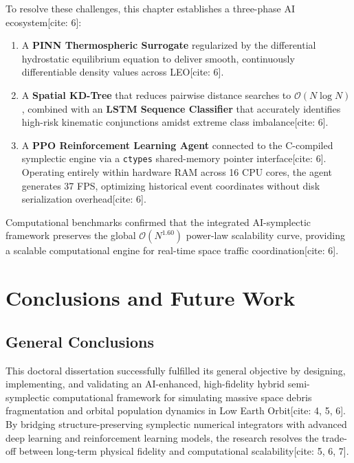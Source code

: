 \documentclass[12pt,letterpaper,twoside]{book}
\begin{document}
To resolve these challenges, this chapter establishes a three-phase AI ecosystem[cite: 6]:
\begin{enumerate}
    \item A \textbf{PINN Thermospheric Surrogate} regularized by the differential hydrostatic equilibrium equation to deliver smooth, continuously differentiable density values across LEO[cite: 6].
    \item A \textbf{Spatial KD-Tree} that reduces pairwise distance searches to $\mathcal{O}(N \log N)$, combined with an \textbf{LSTM Sequence Classifier} that accurately identifies high-risk kinematic conjunctions amidst extreme class imbalance[cite: 6].
    \item A \textbf{PPO Reinforcement Learning Agent} connected to the C-compiled symplectic engine via a \texttt{ctypes} shared-memory pointer interface[cite: 6]. Operating entirely within hardware RAM across 16 CPU cores, the agent generates 37 FPS, optimizing historical event coordinates without disk serialization overhead[cite: 6].
\end{enumerate}
Computational benchmarks confirmed that the integrated AI-symplectic framework preserves the global $\mathcal{O}(N^{1.60})$ power-law scalability curve, providing a scalable computational engine for real-time space traffic coordination[cite: 6].

\newpage


\cleardoublepage

\chapter{Conclusions and Future Work}
\label{ch:conclusions}

\section{General Conclusions}
This doctoral dissertation successfully fulfilled its general objective by designing, implementing, and validating an AI-enhanced, high-fidelity hybrid semi-symplectic computational framework for simulating massive space debris fragmentation and orbital population dynamics in Low Earth Orbit[cite: 4, 5, 6]. By bridging structure-preserving symplectic numerical integrators with advanced deep learning and reinforcement learning models, the research resolves the trade-off between long-term physical fidelity and computational scalability[cite: 5, 6, 7].
\end{document}
